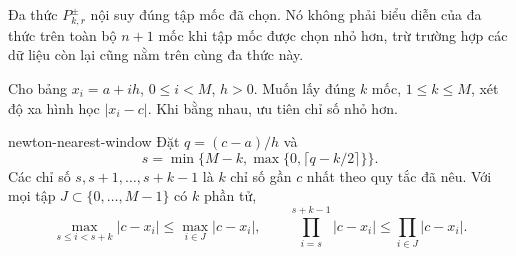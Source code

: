 \documentclass[12pt,a4paper,oneside]{book}
\numberwithin{algorithm}{chapter}
\theoremstyle{definition}
\begin{document}
Đa thức $P_{k,r}^{\pm}$ nội suy đúng tập mốc đã chọn. Nó không phải biểu diễn của đa thức trên toàn bộ $n+1$ mốc khi tập mốc được chọn nhỏ hơn, trừ trường hợp các dữ liệu còn lại cũng nằm trên cùng đa thức này.

Cho bảng $x_i=a+ih$, $0\leq i<M$, $h>0$. Muốn lấy đúng $k$ mốc, $1\leq k\leq M$, xét độ xa hình học $|x_i-c|$. Khi bằng nhau, ưu tiên chỉ số nhỏ hơn.
\begin{menhde}{}{newton-nearest-window}
Đặt $q=(c-a)/h$ và
\begin{equation}\label{eq:newton-nearest-window}
 s=\min\bigl\{M-k,\max\{0,\lceil q-k/2\rceil\}\bigr\}.
\end{equation}
Các chỉ số $s,s+1,\ldots,s+k-1$ là $k$ chỉ số gần $c$ nhất theo quy tắc đã nêu. Với mọi tập $J\subset\{0,\ldots,M-1\}$ có $k$ phần tử,
\[
 \max_{s\leq i<s+k}|c-x_i|\leq\max_{i\in J}|c-x_i|,
 \qquad
 \prod_{i=s}^{s+k-1}|c-x_i|\leq\prod_{i\in J}|c-x_i|.
\]
\end{menhde}
\end{document}
